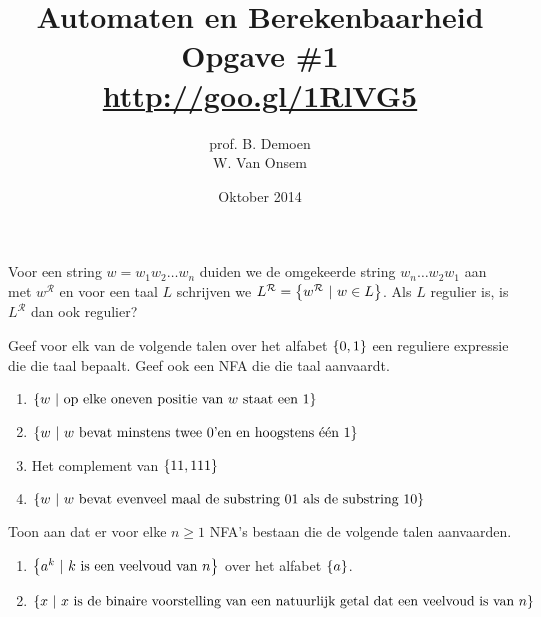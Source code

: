 \documentclass[a4paper]{article}
\title{Automaten en Berekenbaarheid\\Opgave \#1\\\url{http://goo.gl/1RlVG5}}
\author{prof. B. Demoen\\W. Van Onsem}
\date{Oktober 2014}
\newcommand{\R}{\mathcal{R}}
\begin{document}
\maketitle

\begin{question}
Voor een string $w = w_1 w_2 \ldots w_n$ duiden we de omgekeerde string $w_n \ldots w_2  w_1$ aan met $w^{\R}$ en voor een taal $L$ schrijven we $L^{\R} = \condset{w^{\R}}{w\in L}$. Als $L$ regulier is, is $L^{\R}$ dan ook regulier?
\end{question}
\begin{question}
Geef voor elk van de volgende talen over het alfabet $\left\{ 0,1 \right\}$ een reguliere expressie die die taal bepaalt. Geef ook een NFA die die taal aanvaardt.
\begin{enumerate}
  \item $\left\{ w\ |\ \mbox{op elke oneven positie van $w$ staat een $1$} \right\}$
  \item $\left\{ w\ |\ \mbox{$w$ bevat minstens twee $0$'en en hoogstens \'e\'en $1$} \right\}$
  \item Het complement van $\left\{ 11,111 \right\}$
  \item $\left\{ w\ |\ \mbox{$w$ bevat evenveel maal de substring $01$ als de substring $10$} \right\}$
\end{enumerate}
\end{question}
\begin{question}
Toon aan dat er voor elke $n \geq 1$ NFA's bestaan die de volgende talen aanvaarden.
\begin{enumerate}
  \item $\left\{ a^k\ |\ \mbox{$k$ is een veelvoud van $n$} \right\}$ over het alfabet $\left\{ a \right\}$.
  \item $\left\{ x\ |\ \mbox{$x$ is de binaire voorstelling van een natuurlijk getal dat een veelvoud is van $n$} \right\}$
\end{enumerate}
\end{question}
\end{document}
